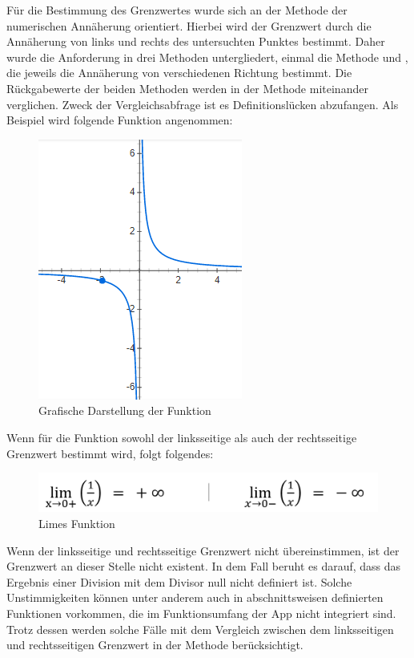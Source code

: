 Für die Bestimmung des Grenzwertes wurde sich an der Methode der numerischen Annäherung orientiert. Hierbei wird der Grenzwert durch die Annäherung von links und rechts des untersuchten Punktes bestimmt. Daher wurde die Anforderung in drei Methoden untergliedert, einmal die Methode  und , die jeweils die Annäherung von verschiedenen Richtung bestimmt. Die Rückgabewerte der beiden Methoden werden in der Methode  miteinander verglichen. Zweck der Vergleichsabfrage ist es Definitionslücken abzufangen. Als Beispiel wird folgende Funktion angenommen:


\begin{figure}[!h]
	\includegraphics[scale=1]{img/funktion-grafik}
	\caption[Grafische Darstellung der Funktion]{Grafische Darstellung der Funktion\footnotemark}
\end{figure}

Wenn für die Funktion sowohl der linksseitige als auch der rechtsseitige Grenzwert bestimmt wird, folgt folgendes:  

\begin{figure}[!h]
	\includegraphics[width=\columnwidth]{img/limes-funktionen}
	\caption[Limes Funktion]{Limes Funktion\footnotemark}
\end{figure}

Wenn der linksseitige und rechtsseitige Grenzwert nicht übereinstimmen, ist der Grenzwert an dieser Stelle nicht existent. In dem Fall beruht es darauf, dass das Ergebnis einer Division mit dem Divisor null nicht definiert ist. Solche Unstimmigkeiten können unter anderem auch in abschnittsweisen definierten Funktionen vorkommen, die im Funktionsumfang der App nicht integriert sind. Trotz dessen werden solche Fälle mit dem Vergleich zwischen dem linksseitigen und rechtsseitigen Grenzwert in der Methode  berücksichtigt.


